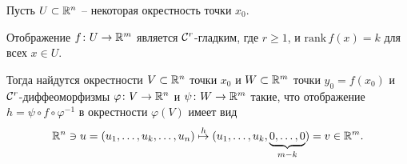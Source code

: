 	\begin{theorem}
		Пусть $U \subset \mathbb{R}^n$ -- некоторая окрестность точки $x_0$.
		
		Отображение $f\colon U \to \mathbb{R}^m$ является $\mathcal{C}^r$-гладким, где $r \ge 1$, и $\text{rank}\,f(x) = k$ для всех $x \in U$.
		
		Тогда найдутся окрестности $V \subset \mathbb{R}^n$ точки $x_0$ и $W \subset \mathbb{R}^m$ точки $y_0 = f(x_0)$ и $\mathcal{C}^r$-диффеоморфизмы $\varphi\colon V \to \mathbb{R}^n$ и $\psi\colon W \to \mathbb{R}^m$ такие, что отображение $h = \psi \circ f \circ \varphi^{-1}$ в окрестности $\varphi(V)$ имеет вид
		\begin{align}\label{theoremaORange}
			\mathbb{R}^n \ni u = (u_1, \dots, u_k, \dots, u_n) \overset{h}{\mapsto} (u_1, \dots, u_k, \underbrace{0, \dots, 0}_{m-k}) = v \in \mathbb{R}^m.
		\end{align}
	\end{theorem}
